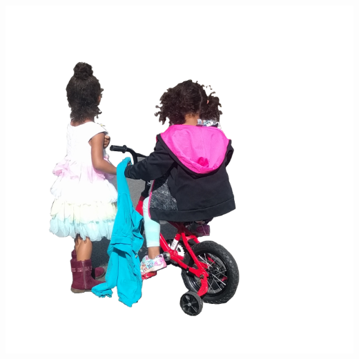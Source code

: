 \documentclass[14pt]{extarticle}
\begin{document}
\begin{minipage}{0.2\textwidth}
\begin{flushright}
\includegraphics[width = 1.2\textwidth]{kids-small.png}
\end{flushright}
\end{minipage}
\end{document}
